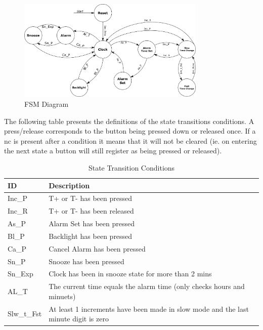 \documentclass{article}
\begin{document}
\begin{figure}[h!]
    \centering
    \includegraphics[width=0.8\textwidth]{fsm.png}
    \caption{FSM Diagram}
    \label{fig:fsm}
\end{figure}

The following table presents the definitions of the state transitions conditions. A press/release corresponds to the button being pressed down or released once. If a nc is present after a condition it means that it will not be cleared (ie. on entering the next state a button will still register as being pressed or released).
\newpage
\begin{table}[h]
    \centering
    \begin{tabular}{l|l}
        \textbf{ID} & \textbf{Description}\\\hline
        Inc\_P &  T+ or T- has been pressed\\
        Inc\_R &  T+ or T- has been released\\
        As\_P  &  Alarm Set has been pressed\\
        Bl\_P  &  Backlight has been pressed\\
        Ca\_P &   Cancel Alarm has been pressed\\
        Sn\_P &   Snooze has been pressed\\
        Sn\_Exp & Clock has been in snooze state for more than 2 mins\\
        AL\_T &  The current time equals the alarm time (only checks hours and minuets)\\
        Slw\_t\_Fst & At least 1 increments have been made in slow mode and the last minute digit is zero
    \end{tabular}
    \caption{State Transition Conditions}
    \label{tab:my_label}
\end{table}
\end{document}
